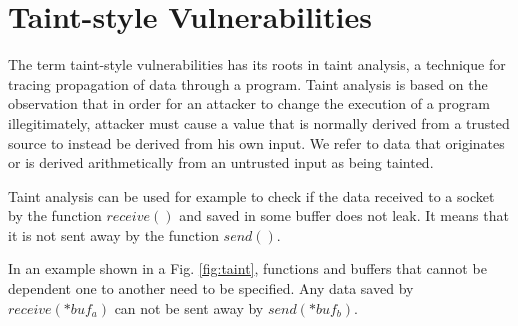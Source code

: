 \documentclass[a4paper, 12pt, journal, onecolumn]{IEEEtran}
\begin{document}





\section{Taint-style Vulnerabilities}


The term taint-style vulnerabilities has its roots in taint analysis, a technique for tracing  propagation of data through a program.\cite{a6} Taint analysis is based on the observation that in order for an attacker to change the execution of a program illegitimately, attacker must cause a value that is normally derived from a trusted source to instead be derived from his own input. We refer to data that originates or is derived arithmetically from an untrusted input as being tainted. \cite{taint2}

Taint analysis can be used for example to check if the data received to a socket by the function $receive()$ and saved in some buffer does not leak. It means that it is not sent away by the function $send()$.

In an example shown in a Fig. \ref{fig:taint}, functions and buffers that cannot be dependent one to another need to be specified. Any data saved by $receive(*buf_a)$ can not be sent away by $send(*buf_b)$. 
\\
\end{document}
